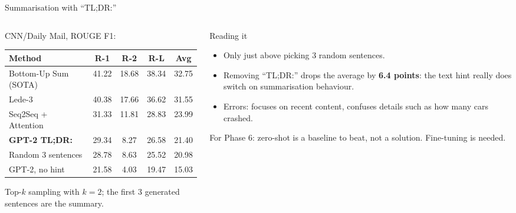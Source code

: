\documentclass[aspectratio=169,11pt]{beamer}
\begin{document}
\begin{frame}{Summarisation with ``TL;DR:''}
  \begin{columns}[T]
    \begin{column}{0.52\textwidth}
      \footnotesize
      CNN/Daily Mail, ROUGE F1:
      \vspace{1mm}

      \begin{tabular}{@{}lcccc@{}}
        \toprule
        Method & R-1 & R-2 & R-L & Avg\\
        \midrule
        Bottom-Up Sum (SOTA) & 41.22 & 18.68 & 38.34 & 32.75\\
        Lede-3 & 40.38 & 17.66 & 36.62 & 31.55\\
        Seq2Seq + Attention & 31.33 & 11.81 & 28.83 & 23.99\\
        \textbf{GPT-2 TL;DR:} & 29.34 & 8.27 & 26.58 & 21.40\\
        Random 3 sentences & 28.78 & 8.63 & 25.52 & 20.98\\
        GPT-2, no hint & 21.58 & 4.03 & 19.47 & 15.03\\
        \bottomrule
      \end{tabular}
      \vspace{1mm}

      {\scriptsize Top-$k$ sampling with $k=2$; the first 3 generated sentences are the summary.}
    \end{column}
    \begin{column}{0.44\textwidth}
      \begin{exampleblock}{Reading it}
        \small
        \begin{itemize}
          \item Only just above picking 3 random sentences.
          \item Removing ``TL;DR:'' drops the average by \textbf{6.4 points}: the text hint really does switch on summarisation behaviour.
          \item Errors: focuses on recent content, confuses details such as how many cars crashed.
        \end{itemize}
        For Phase 6: zero-shot is a baseline to beat, not a solution. Fine-tuning is needed.
      \end{exampleblock}
    \end{column}
  \end{columns}
\end{frame}
\end{document}
